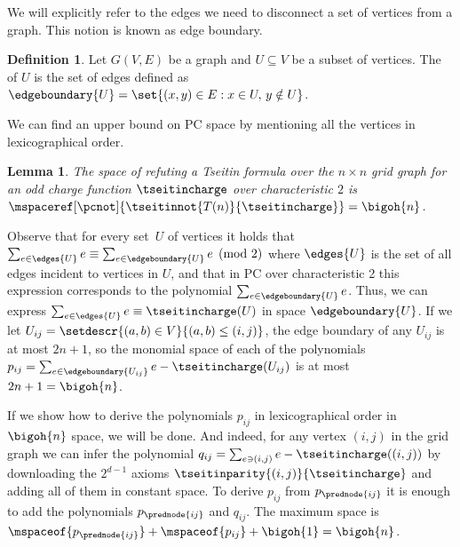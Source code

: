\documentclass[11pt]{article}
\numberwithin{equation}{section}
\newtheorem{lemma}[theorem]{Lemma}
\theoremstyle{definition}
\newtheorem{definition}[theorem]{Definition}
\theoremstyle{plain}
\begin{document}
We will explicitly refer to the edges we need to disconnect a set of vertices from a graph. This notion is known as edge boundary.
\begin{definition}
  \label{def:edge-boundary}
  Let $G(V,E)$ be a graph and $U\subseteq V$ be a subset of vertices. The  of $U$ is the set of edges
  defined as %
  $\edgeboundary{U}=\set{(x,y)\in E : x\in U,\,y\notin U}$.
\end{definition}

We can find an upper bound on PC space by mentioning all the vertices in lexicographical order.

\begin{lemma}
  The space of refuting a Tseitin formula over the $n\times n$ grid graph for an odd charge function $\tseitincharge$ over characteristic $2$ is $\mspaceref[\pcnot]{\tseitinnot{T(n)}{\tseitincharge}}=\bigoh{n}$.
\end{lemma}
\begin{ourproof}[sketch]
  Observe that for every %
  set~$U$ of vertices
  it holds that $\sum_{e \in \edges{U}} e \equiv \sum_{e \in \edgeboundary{U}}e \pmod{2}$ where $\edges{U}$ is the set of all edges incident to vertices in $U$, and that in PC over characteristic 2 this expression corresponds to the polynomial $\sum_{e \in \edgeboundary{U}}e$. Thus, we can express $\sum_{e \in \edges{U}} e \equiv \tseitincharge(U)$ in space $\edgeboundary{U}$. If we let $U_{ij}=\setdescr{(a,b)\in V}{(a,b)\leq (i,j)}$, the edge boundary of any $U_{ij}$ is at most $2n+1$, so the monomial space of each of the polynomials $p_{ij}=\sum_{e \in \edgeboundary{U_{ij}}}e-\tseitincharge(U_{ij})$ is at most $2n+1=\bigoh{n}$.

  If we show how to derive the polynomials $p_{ij}$ in lexicographical order in $\bigoh{n}$ space, we will be done. And indeed, for any vertex $(i,j)$ in the grid graph we can infer the polynomial $q_{ij}=\sum_{e\ni (i,j)}e-\tseitincharge((i, j))$ by downloading the $2^{d-1}$ axioms $\tseitinparity{(i,j)}{\tseitincharge}$ and adding all of them in constant space. To derive $p_{ij}$ from $p_{\prednode{ij}}$ it is enough to add the polynomials $p_{\prednode{ij}}$ and $q_{ij}$. The maximum space is $\mspaceof{p_{\prednode{ij}}}+\mspaceof{p_{ij}}+\bigoh{1}=\bigoh{n}$.
\end{ourproof}
\end{document}
